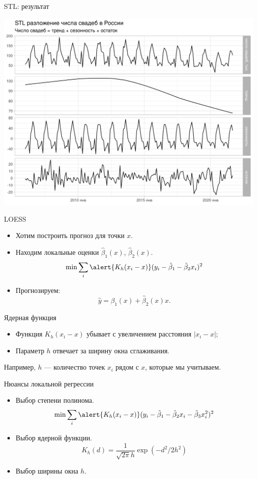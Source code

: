 \begin{frame}{STL: результат}

  \includegraphics[width=\textwidth]{pictures/om_ts_01-074.png}


\end{frame}

\begin{frame}{LOESS}

\begin{itemize}
  \item Хотим построить прогноз для точки $x$.
  \item Находим \alert{локальные оценки} $\hat\beta_1(x)$, $\hat\beta_2(x)$. 
  \[
      \min \sum_i \alert{K_h(x_i - x)} (y_i - \hat\beta_1 - \hat\beta_2 x_i)^2
  \]
  \item Прогнозируем:
  \[
  \hat y = \hat\beta_1(x) + \hat\beta_2(x) x.  
  \] 
\end{itemize}

\pause
\alert{Ядерная функция}
\begin{itemize}
  \item Функция $K_h(x_i - x)$ убывает с увеличением расстояния $|x_i - x|$;
  \item Параметр $h$ отвечает за ширину окна сглаживания. 
\end{itemize}

\pause
Например, $h$ — количество точек $x_i$ рядом с $x$, которые мы учитываем.

\end{frame}

\begin{frame}{Нюансы локальной регрессии}

  \begin{itemize}
    \item Выбор \alert{степени полинома}.
    \[
      \min \sum_i \alert{K_h(x_i - x)} (y_i - \hat\beta_1 - \hat\beta_2 x_i - \hat\beta_3 x_i^2)^2
    \]  
    \item Выбор \alert{ядерной} функции.
    \[
      K_h(d) = \frac{1}{\sqrt{2\pi}h} \exp(- d^2/2h^2)
    \]
    \item Выбор \alert{ширины окна} $h$.

\end{itemize}

\end{frame}

